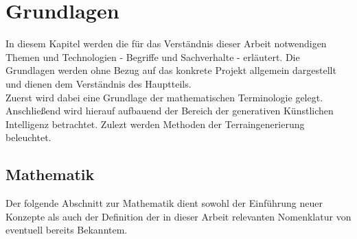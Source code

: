 
\chapter{Grundlagen}
\label{ch:Grundlagen}

In diesem Kapitel werden die für das Verständnis dieser Arbeit notwendigen Themen und Technologien - Begriffe und Sachverhalte - erläutert.
Die Grundlagen werden ohne Bezug auf das konkrete Projekt allgemein dargestellt und dienen dem Verständnis des Hauptteils. \\
Zuerst wird dabei eine Grundlage der mathematischen Terminologie gelegt. Anschließend wird hierauf aufbauend der Bereich der generativen Künstlichen Intelligenz betrachtet. Zulezt werden Methoden der Terraingenerierung beleuchtet.

\section{Mathematik}

Der folgende Abschnitt zur Mathematik dient sowohl der Einführung neuer Konzepte als auch der Definition der in dieser Arbeit relevanten Nomenklatur von eventuell bereits Bekanntem.

